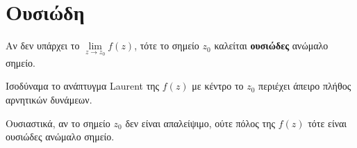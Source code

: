 \section*{Ουσιώδη}

\begin{dfn}
  Αν δεν υπάρχει το $\lim\limits_{z\to z_0}f(z)$, τότε το σημείο $z_0$ καλείται 
  \textbf{ουσιώδες} ανώμαλο σημείο. 

  \begin{myitemize}
    \item Ισοδύναμα το ανάπτυγμα \textlatin{Laurent} της $f(z)$ \textcolor{Col2}{με κέντρο το $z_0$} 
      περιέχει άπειρο πλήθος αρνητικών δυνάμεων.
  \end{myitemize}
\end{dfn}

\begin{rem}
  Ουσιαστικά, αν το σημείο $z_0$ δεν είναι απαλείψιμο, ούτε πόλος της 
  $f(z)$ τότε είναι ουσιώδες ανώμαλο σημείο.
\end{rem}




